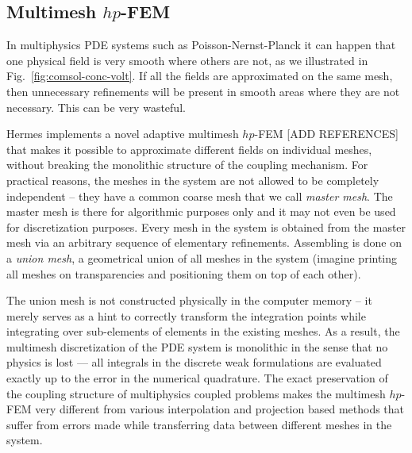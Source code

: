 \subsection{Multimesh $hp$-FEM}
In multiphysics PDE systems such as Poisson-Nernst-Planck it can 
happen that one physical field is very smooth where others are not,
as we illustrated in Fig.~\ref{fig:comsol-conc-volt}. 
If all the fields are approximated on the same mesh, then 
unnecessary refinements will be present in smooth areas
where they are not necessary. This can be very wasteful.

Hermes implements a novel adaptive multimesh $hp$-FEM [ADD REFERENCES]
that makes it possible to approximate different fields on individual meshes,
without breaking the monolithic structure of the coupling mechanism.
For practical reasons, the meshes in the system are not allowed to be 
completely independent -- they have a common coarse mesh that we call {\em 
master mesh}. The master mesh is 
there for algorithmic purposes only and it may not even be used for 
discretization purposes. Every mesh in the system is obtained from 
the master mesh via an arbitrary sequence of elementary refinements. 
Assembling is done on a {\em union mesh}, a geometrical union of 
all meshes in the system (imagine printing all meshes on transparencies and 
positioning them on top of each other). 

The union mesh is not constructed physically in the computer 
memory -- it merely serves as a hint to correctly transform the 
integration points while integrating over sub-elements of elements 
in the existing meshes. 
As a result, the multimesh discretization of the PDE system is 
monolithic in the sense that no physics is lost --- all integrals 
in the discrete weak formulations are evaluated exactly up to 
the error in the numerical quadrature. The exact preservation of 
the coupling structure of multiphysics coupled problems makes 
the multimesh $hp$-FEM very different from various interpolation 
and projection based methods that suffer from errors made
while transferring data between different meshes in the system. 


